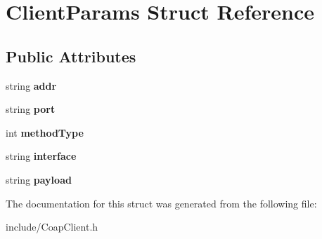 \hypertarget{structClientParams}{}\section{Client\+Params Struct Reference}
\label{structClientParams}
\subsection*{Public Attributes}
\begin{DoxyCompactItemize}
\item 
\mbox{\label{structClientParams_a3277dd9bc0fa8283a7d3b82d53f3c16a}} 
string {\bfseries addr}
\item 
\mbox{\label{structClientParams_ade2b9a6084d6b1989c3440fe2cd60fdb}} 
string {\bfseries port}
\item 
\mbox{\label{structClientParams_aa40f37f1eeb3ed6cff8a76e92a7e9bd1}} 
int {\bfseries method\+Type}
\item 
\mbox{\label{structClientParams_a6af6f3817ebf9ed3f7d9378e6a23a59e}} 
string {\bfseries interface}
\item 
\mbox{\label{structClientParams_aa16d76f3cbdfa5bfd4e54bcdb9a25737}} 
string {\bfseries payload}
\end{DoxyCompactItemize}


The documentation for this struct was generated from the following file\+:\begin{DoxyCompactItemize}
\item 
include/Coap\+Client.\+h\end{DoxyCompactItemize}
